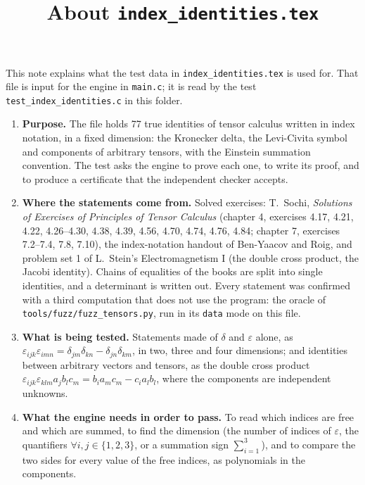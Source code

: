 \documentclass[11pt,a4paper]{article}
\title{About \texttt{index\_identities.tex}}
\author{}
\date{}
\begin{document}
\maketitle
This note explains what the test data in \texttt{index\_identities.tex} is used for. That file is input for the engine in \texttt{main.c}; it is read by the test \texttt{test\_index\_identities.c} in this folder.

\begin{enumerate}
\item \textbf{Purpose.} The file holds 77 true identities of tensor calculus written in index notation, in a fixed dimension: the Kronecker delta, the Levi-Civita symbol and components of arbitrary tensors, with the Einstein summation convention. The test asks the engine to prove each one, to write its proof, and to produce a certificate that the independent checker accepts.

\item \textbf{Where the statements come from.} Solved exercises: T.~Sochi, \emph{Solutions of Exercises of Principles of Tensor Calculus} (chapter 4, exercises 4.17, 4.21, 4.22, 4.26--4.30, 4.38, 4.39, 4.56, 4.70, 4.74, 4.76, 4.84; chapter 7, exercises 7.2--7.4, 7.8, 7.10), the index-notation handout of Ben-Yaacov and Roig, and problem set 1 of L.~Stein's Electromagnetism I (the double cross product, the Jacobi identity). Chains of equalities of the books are split into single identities, and a determinant is written out. Every statement was confirmed with a third computation that does not use the program: the oracle of \texttt{tools/fuzz/fuzz\_tensors.py}, run in its \texttt{data} mode on this file.

\item \textbf{What is being tested.} Statements made of $\delta$ and $\varepsilon$ alone, as $\varepsilon_{ijk}\varepsilon_{imn} = \delta_{jm}\delta_{kn} - \delta_{jn}\delta_{km}$, in two, three and four dimensions; and identities between arbitrary vectors and tensors, as the double cross product $\varepsilon_{ijk}\varepsilon_{klm} a_{j} b_{l} c_{m} = b_{i} a_{m} c_{m} - c_{i} a_{l} b_{l}$, where the components are independent unknowns.

\item \textbf{What the engine needs in order to pass.} To read which indices are free and which are summed, to find the dimension (the number of indices of $\varepsilon$, the quantifiers $\forall i, j \in \{1, 2, 3\}$, or a summation sign $\sum_{i=1}^{3}$), and to compare the two sides for every value of the free indices, as polynomials in the components.


\end{enumerate}
\end{document}
